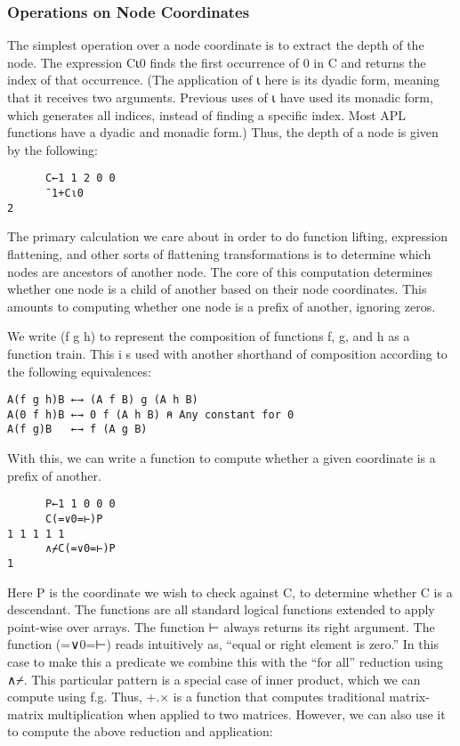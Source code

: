\documentclass[pldi]{sigplanconf-pldi15}
\begin{document}
\subsubsection{Operations on Node Coordinates}

The simplest operation over a node coordinate is to extract the depth of the node. The 
expression C⍳0 finds the first occurrence of 0 in C and returns the index of that 
occurrence. (The application of ⍳ here is its dyadic form, meaning that it receives two 
arguments. Previous uses of ⍳ have used its monadic form, which generates all indices, 
instead of finding a specific index. Most APL functions have a dyadic and monadic form.) 
Thus, the depth of a node is given by the following:

\begin{verbatim}
      C←1 1 2 0 0
      ¯1+C⍳0
2
\end{verbatim}

The primary calculation we care about in order to do function lifting, expression flattening, 
and other sorts of flattening transformations is to determine which nodes are ancestors of 
another node. The core of this computation determines whether one node is a child of another 
based on their node coordinates. This amounts to computing whether one node is a prefix of 
another, ignoring zeros.

We write (f g h) to represent the composition of functions f, g, and h as a function train. This i
s used with another shorthand of composition according to the following equivalences:

\begin{verbatim}
A(f g h)B ←→ (A f B) g (A h B)
A(0 f h)B ←→ 0 f (A h B) ⍝ Any constant for 0
A(f g)B   ←→ f (A g B)
\end{verbatim}

With this, we can write a function to compute whether a given coordinate is a prefix of another.

\begin{verbatim}
      P←1 1 0 0 0
      C(=∨0=⊢)P
1 1 1 1 1
      ∧⌿C(=∨0=⊢)P
1
\end{verbatim}

Here P is the coordinate we wish to check against C, to determine whether C is a descendant. The
 functions are all standard logical functions extended to apply point-wise over arrays. The 
 function ⊢ always returns its right argument. The function (=∨0=⊢) reads intuitively as, “equal or 
 right element is zero.” In this case to make this a predicate we combine this with the “for all” 
 reduction using ∧⌿. This particular pattern is a special case of inner product, which we can compute 
 using f.g. Thus, +.× is a function that computes traditional matrix-matrix multiplication when applied 
 to two matrices. However, we can also use it to compute the above reduction and application:
 
\end{document}
